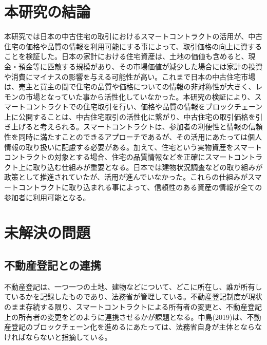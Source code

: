 \documentclass[a4paper,fontsize=11pt,report,notitlepage,line_length=38zw,number_of_lines=40,dvipdfmx]{jlreq}
\begin{document}
\section{本研究の結論}
本研究では日本の中古住宅の取引におけるスマートコントラクトの活用が、中古住宅の価格や品質の情報を利用可能にする事によって、取引価格の向上に資することを検証した。日本の家計における住宅資産は、土地の価値も含めると、現金・預金等に匹敵する規模があり、その市場価値が減少した場合には家計の投資や消費にマイナスの影響を与える可能性が高い。これまで日本の中古住宅市場は、売主と買主の間で住宅の品質や価格についての情報の非対称性が大きく、レモンの市場となっていた事から活性化していなかった。本研究の検証により、スマートコントラクトでの住宅取引を行い、価格や品質の情報をブロックチェーン上に公開することは、中古住宅取引の活性化に繋がり、中古住宅の取引価格を引き上げると考えられる。スマートコントラクトは、参加者の利便性と情報の信頼性を同時に満たすことのできるアプローチであるが、その活用にあたっては個人情報の取り扱いに配慮する必要がある。加えて、住宅という実物資産をスマートコントラクトの対象とする場合、住宅の品質情報などを正確にスマートコントラクト上に取り込む仕組みが重要となる。日本では建物状況調査などの取り組みが政策として推進されていたが、活用が進んでいなかった。これらの仕組みがスマートコントラクトに取り込まれる事によって、信頼性のある資産の情報が全ての参加者に利用可能となる。

\section{未解決の問題}
\subsection{不動産登記との連携}
不動産登記は、一つ一つの土地、建物などについて、どこに所在し、誰が所有しているかを記録したものであり、法務省が管理している。不動産登記制度が現状のまま存続する限り、スマートコントラクトによる所有者の変更と、不動産登記上の所有者の変更をどのように連携させるかが課題となる。中島(2019)\cite{nakajima2019}は、不動産登記のブロックチェーン化を進めるにあたっては、法務省自身が主体とならなければならないと指摘している。
\end{document}
